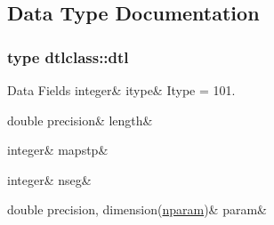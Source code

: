 \subsection{Data Type Documentation}
\label{structdtlclass_1_1dtl}
\subsubsection{type dtlclass\+::dtl}
\begin{DoxyFields}{Data Fields}
\mbox{\label{namespacedtlclass_a75f1d8c2908cb2ac40cd24dc45a122ff}} 
integer&
itype&
Itype = 101. \\
\hline

\mbox{\label{namespacedtlclass_ac3b7a490164af376dab82d59957bcdd3}} 
double precision&
length&
\\
\hline

\mbox{\label{namespacedtlclass_ad89c7805074fee80c05af3ae3861cb87}} 
integer&
mapstp&
\\
\hline

\mbox{\label{namespacedtlclass_ab0c5195ab0993ee3107484257b94cfe5}} 
integer&
nseg&
\\
\hline

\mbox{\label{namespacedtlclass_a95bc1c81e12444e39d8ea61b6e67ae34}} 
double precision, dimension(\mbox{\hyperlink{namespacedtlclass_adf04761c96168c3dc492c89c72194cea}{nparam}})&
param&
\\
\hline

\end{DoxyFields}

